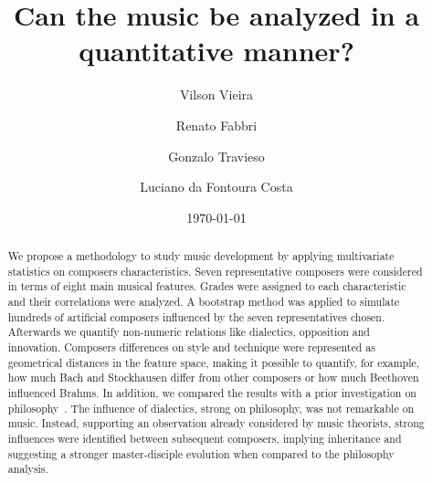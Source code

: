 \documentclass[
 aip,
 jmp,
 amsmath,amssymb,
 reprint,
]{revtex4-1}
\begin{document}

\title[Can the music be analyzed in a quantitative manner?]{Can the music be analyzed in a quantitative manner?}

\author{Vilson Vieira}

\author{Renato Fabbri}

\author{Gonzalo Travieso}
  \homepage{}

\author{Luciano da Fontoura Costa}

\date{\today}

\begin{abstract}

We propose a
methodology
to study music development by
applying multivariate statistics on composers characteristics.
Seven representative composers were considered in terms of
eight main musical features. 
Grades
were assigned to each characteristic and their correlations were
analyzed. 
A bootstrap method was
applied to simulate hundreds of artificial composers
influenced by the seven representatives chosen.
Afterwards we quantify non-numeric relations like dialectics, opposition
and innovation.
Composers differences on style and technique were represented
as geometrical distances in the feature space, making it possible to
quantify, for example, how much Bach and Stockhausen differ from other composers or how
much Beethoven influenced Brahms.
In addition, we compared the results with a prior investigation
on
philosophy~\cite{Fabbri}. The influence of dialectics, strong on
philosophy, was not remarkable on music.
Instead, supporting an observation already considered by music
theorists, strong influences were identified between
subsequent composers, implying inheritance and suggesting a stronger
master-disciple evolution when compared to the philosophy analysis.
\end{abstract}


\maketitle
\end{document}
